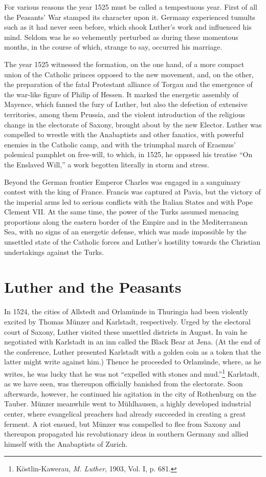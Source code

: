 For various reasons the year 1525 must be called a tempestuous
year. First of all the Peasants’ War stamped its character upon it.
Germany experienced tumults such as it had never seen before, which
shook Luther’s work and influenced his mind. Seldom was he so vehemently
perturbed as during these momentous months, in the
course of which, strange to say, occurred his marriage.

The year 1525 witnessed the formation, on the one hand, of a more
compact union of the Catholic princes opposed to the new movement,
and, on the other, the preparation of the fatal Protestant
alliance of Torgau and the emergence of the war-like figure of Philip
of Hessen. It marked the energetic assembly of Mayence, which
fanned the fury of Luther, but also the defection of extensive territories,
among them Prussia, and the violent introduction of the religious
change in the electorate of Saxony, brought about by the new
Elector. Luther was compelled to wrestle with the Anabaptists and
other fanatics, with powerful enemies in the Catholic camp, and with
the triumphal march of Erasmus’ polemical pamphlet on free-will, to
which, in 1525, he opposed his treatise “On the Enslaved Will,” a
work begotten literally in storm and stress.

Beyond the German frontier Emperor Charles was engaged in a
sanguinary contest with the king of France. Francis was captured at
Pavia, but the victory of the imperial arms led to serious conflicts with
the Italian States and with Pope Clement VII. At the same time,
the power of the Turks assumed menacing proportions along the
eastern border of the Empire and in the Mediterranean Sea, with no
signs of an energetic defense, which was made impossible by the unsettled
state of the Catholic forces and Luther’s hostility towards the
Christian undertakings against the Turks.

\section{Luther and the Peasants}

In 1524, the cities of Allstedt and Orlamünde in Thuringia had
been violently excited by Thomas Münzer and Karlstadt, respectively.
Urged by the electoral court of Saxony, Luther visited these unsettled
districts in August. In vain he negotiated with Karlstadt in
an inn called the Black Bear at Jena. (At the end of the conference,
Luther presented Karlstadt with a golden coin as a token that the latter
might write against him.) Thence he proceeded to Orlamünde,
where, as he writes, he was lucky that he was not “expelled with
stones and mud.”\footnote{Köstlin-Kawerau, \textit{M. Luther}, 1903, Vol. I, p. 681.}
Karlstadt, as we have seen, was thereupon officially banished from the
electorate. Soon afterwards, however, he
continued his agitation in the city of Rothenburg on the Tauber.
Münzer meanwhile went to Mühlhausen, a highly developed industrial center,
where evangelical preachers had already succeeded in
creating a great ferment. A riot ensued, but Münzer was compelled
to flee from Saxony and thereupon propagated his revolutionary ideas
in southern Germany and allied himself with the Anabaptists of
Zurich.

